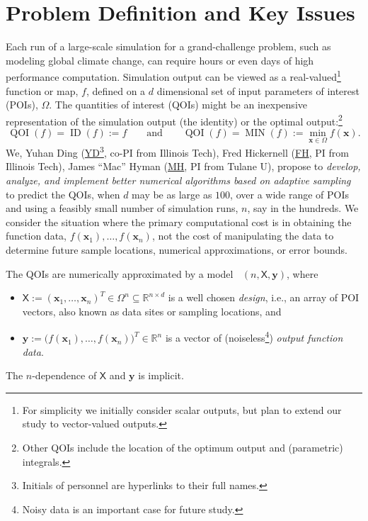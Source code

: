 \documentclass[11pt]{NSFamsart}
\newcommand{\FH}{\hyperlink{FHlink}{FH}\xspace}
\newcommand{\MH}{\hyperlink{MHlink}{MH}\xspace}
\newcommand{\YD}{\hyperlink{YDlink}{YD}\xspace}
\DeclareMathOperator{\QOI}{QOI} %
\DeclareMathOperator{\APP}{\widehat{\QOI}}
\DeclareMathOperator{\MIN}{MIN}
\DeclareMathOperator{\ID}{ID}
\newcommand{\reals}{{\mathbb{R}}}
\newcommand{\mX}{\mathsf{X}}
\newcommand{\bx}{{\boldsymbol{x}}}
\newcommand{\by}{{\boldsymbol{y}}}
\begin{document}
\section{Problem Definition and Key Issues} \label{sec:defineProb}
Each run of a large-scale simulation for a grand-challenge problem, such as modeling global climate change, can require hours or even days of high performance computation. Simulation output can be viewed as a real-valued\footnote{For simplicity we initially consider scalar outputs, but plan to extend our study to vector-valued outputs.}  function or map, $f$, defined on a $d$ dimensional set of input parameters of interest (POIs), $\Omega$. The quantities of interest (QOIs) might be 
an inexpensive representation of the simulation output (the identity) or the optimal output:\footnote{Other QOIs include the location of the optimum output and (parametric) integrals.} 
\begin{equation} \label{eq:ourQOIs}
\QOI(f) = \ID(f) := f \qquad \text{and} \qquad \QOI(f) = \MIN(f) := \min_{\bx \in \Omega} f(\bx).
\end{equation}
We,  \hypertarget{YDlink}{Yuhan Ding} (\YD\footnote{Initials of personnel are hyperlinks to their full names.}, co-PI from Illinois Tech), \hypertarget{FHlink}{Fred Hickernell} (\FH, PI from Illinois Tech), \hypertarget{MHlink}{James ``Mac'' Hyman} (\MH, PI from Tulane U),  propose to \emph{develop, analyze, and implement better numerical algorithms based on adaptive sampling} to predict the QOIs, when $d$ may be as large as $100$, over a wide range of POIs and using a feasibly small number of simulation runs, $n$, say in the hundreds. We consider the situation where the primary computational cost is in obtaining the function data, $f(\bx_1), \ldots, f(\bx_n)$, not the cost of manipulating the data to determine future sample locations, numerical approximations, or error bounds. 

The QOIs are numerically approximated by a model $\APP(n,\mX,\by)$, where 
\begin{itemize}
\item $\mX := (\bx_1, \ldots, \bx_n)^T \in \Omega^{n} \subseteq \reals^{n \times d}$ is a well chosen \emph{design}, i.e., an array of POI vectors, also known as data sites or sampling locations, and
\item $\by := \bigl(f(\bx_1), \ldots, f(\bx_n) \bigr)^T \in \reals^n$ is a vector of (noiseless\footnote{Noisy data is an important case for future study.}) \emph{output function data}.
\end{itemize} 
The $n$-dependence of $\mX$ and $\by$ is implicit. 
\end{document}
